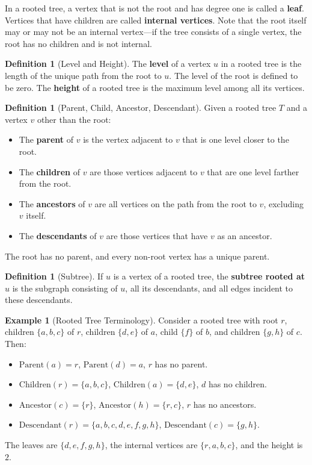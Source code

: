 \documentclass[11pt, a4paper, notitlepage]{report}
\theoremstyle{definition}
\newtheorem{definition}[theorem]{Definition}
\newtheorem{example}[theorem]{Example}
\theoremstyle{remark}
\begin{document}
In a rooted tree, a vertex that is not the root and has degree one is called a \textbf{leaf}. Vertices that have children are called \textbf{internal vertices}. Note that the root itself may or may not be an internal vertex---if the tree consists of a single vertex, the root has no children and is not internal.

\begin{definition}[Level and Height]
\label{def:level-height}
The \textbf{level} of a vertex $u$ in a rooted tree is the length of the unique path from the root to $u$. The level of the root is defined to be zero. The \textbf{height} of a rooted tree is the maximum level among all its vertices.
\end{definition}

\begin{definition}[Parent, Child, Ancestor, Descendant]
\label{def:parent-child}
Given a rooted tree $T$ and a vertex $v$ other than the root:
\begin{itemize}
  \item The \textbf{parent} of $v$ is the vertex adjacent to $v$ that is one level closer to the root.
  \item The \textbf{children} of $v$ are those vertices adjacent to $v$ that are one level farther from the root.
  \item The \textbf{ancestors} of $v$ are all vertices on the path from the root to $v$, excluding $v$ itself.
  \item The \textbf{descendants} of $v$ are those vertices that have $v$ as an ancestor.
\end{itemize}
The root has no parent, and every non-root vertex has a unique parent.
\end{definition}

\begin{definition}[Subtree]
\label{def:subtree}
If $u$ is a vertex of a rooted tree, the \textbf{subtree rooted at $u$} is the subgraph consisting of $u$, all its descendants, and all edges incident to these descendants.
\end{definition}

\begin{example}[Rooted Tree Terminology]
\label{ex:rooted-tree}
Consider a rooted tree with root $r$, children $\{a, b, c\}$ of $r$, children $\{d, e\}$ of $a$, child $\{f\}$ of $b$, and children $\{g, h\}$ of $c$. Then:
\begin{itemize}
  \item $\mathrm{Parent}(a) = r$, \; $\mathrm{Parent}(d) = a$, \; $r$ has no parent.
  \item $\mathrm{Children}(r) = \{a, b, c\}$, \; $\mathrm{Children}(a) = \{d, e\}$, \; $d$ has no children.
  \item $\mathrm{Ancestor}(c) = \{r\}$, \; $\mathrm{Ancestor}(h) = \{r, c\}$, \; $r$ has no ancestors.
  \item $\mathrm{Descendant}(r) = \{a, b, c, d, e, f, g, h\}$, \; $\mathrm{Descendant}(c) = \{g, h\}$.
\end{itemize}
The leaves are $\{d, e, f, g, h\}$, the internal vertices are $\{r, a, b, c\}$, and the height is~$2$.
\end{example}
\end{document}
